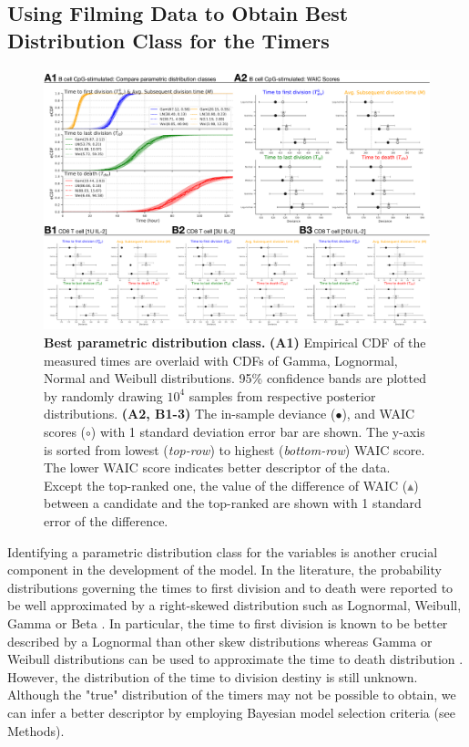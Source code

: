 \documentclass[11pt, a4paper]{article}
\begin{document}
\nolinenumbers
\subsection{Using Filming Data to Obtain Best Distribution Class for the Timers}
\label{sec:distribution_class}
\begin{figure}[t]
    \centering
    \includegraphics[scale=0.45]{figs/fig4.pdf}
    \caption{\textbf{Best parametric distribution class.} \textbf{(A1)} Empirical CDF of the measured times are overlaid with CDFs of Gamma, Lognormal, Normal and Weibull distributions. 95\% confidence bands are plotted by randomly drawing $10^4$ samples from respective posterior distributions. \textbf{(A2, B1-3)} The in-sample deviance ($\bullet$), and WAIC scores ($\circ$) with 1 standard deviation error bar are shown. The y-axis is sorted from lowest (\textit{top-row}) to highest (\textit{bottom-row}) WAIC score. The lower WAIC score indicates better descriptor of the data. Except the top-ranked one, the value of the difference of WAIC (\textcolor{gray}{$\blacktriangle$}) between a candidate and the top-ranked are shown with 1 standard error of the difference.}
    \label{fig:best_distribution}
\end{figure}
\linenumbers
Identifying a parametric distribution class for the variables is another crucial component in the development of the model. In the literature, the probability distributions governing the times to first division and to death were reported to be well approximated by a right-skewed distribution such as Lognormal, Weibull, Gamma or Beta \parencite{Hawkins.2009}. In particular, the time to first division is known to be better described by a Lognormal than other skew distributions whereas Gamma or Weibull distributions can be used to approximate the time to death distribution \parencite{Hawkins.2007}. However, the distribution of the time to division destiny is still unknown. Although the "true" distribution of the timers may not be possible to obtain, we can infer a better descriptor by employing Bayesian model selection criteria (see Methods).
\end{document}
